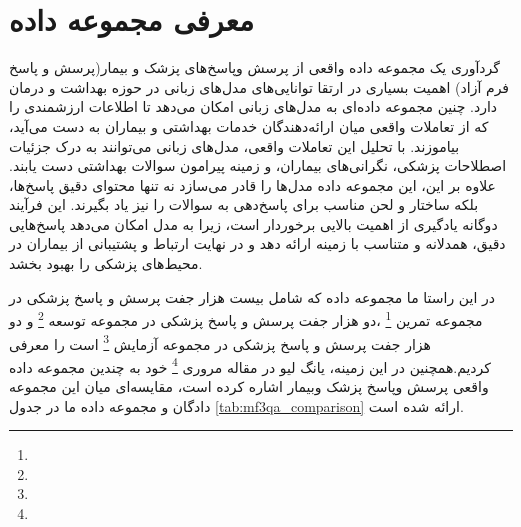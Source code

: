 \section{معرفی مجموعه داده 
}
گردآوری یک مجموعه داده واقعی از پرسش‌ وپاسخ‌های پزشک و بیمار(پرسش و پاسخ فرم آزاد)
اهمیت بسیاری در ارتقا توانایی‌های مدل‌های زبانی در حوزه بهداشت و درمان دارد. چنین مجموعه داده‌ای به مدل‌های زبانی امکان می‌دهد تا اطلاعات ارزشمندی را که از تعاملات واقعی میان ارائه‌دهندگان خدمات بهداشتی و بیماران به دست می‌آید، بیاموزند. با تحلیل این تعاملات واقعی، مدل‌های زبانی می‌توانند به درک جزئیات اصطلاحات پزشکی، نگرانی‌های بیماران، و زمینه پیرامون سوالات بهداشتی دست یابند. علاوه بر این، این مجموعه داده مدل‌ها را قادر می‌سازد نه تنها محتوای دقیق پاسخ‌ها، بلکه ساختار و لحن مناسب برای پاسخ‌دهی به سوالات را نیز یاد بگیرند. این فرآیند دوگانه یادگیری از اهمیت بالایی برخوردار است، زیرا به مدل امکان می‌دهد پاسخ‌هایی دقیق، همدلانه و متناسب با زمینه ارائه دهد و در نهایت ارتباط و پشتیبانی از بیماران در محیط‌های پزشکی را بهبود بخشد.

در این راستا ما مجموعه داده
که شامل بیست هزار جفت پرسش و پاسخ پزشکی در مجموعه تمرین
\footnote{}
،دو هزار جفت پرسش و پاسخ پزشکی در مجموعه توسعه
\footnote{}
و دو هزار جفت پرسش و پاسخ پزشکی در مجموعه آزمایش
\footnote{}
است را معرفی کردیم.همچنین در این زمینه، یانگ لیو در مقاله مروری
\footnote{}
خود 
\cite{b56}
به چندین مجموعه داده واقعی پرسش‌ وپاسخ پزشک وبیمار اشاره کرده است، مقایسه‌ای میان این مجموعه‌ دادگان و مجموعه داده ما در جدول 
\ref{tab:mf3qa_comparison}
ارائه شده است.


